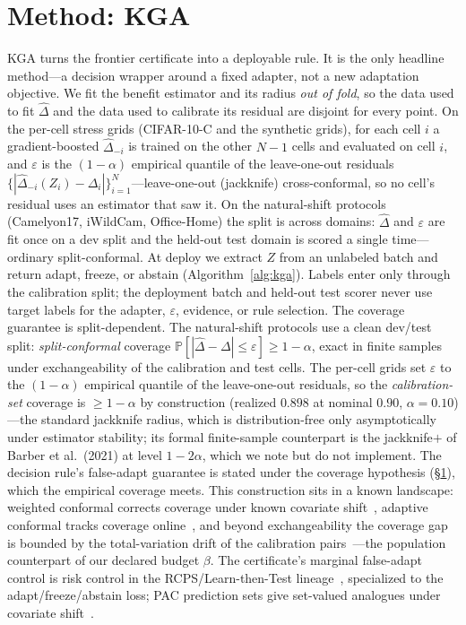 \documentclass[conference]{IEEEtran}
\theoremstyle{plain}
\theoremstyle{definition}
\theoremstyle{remark}
\renewcommand{\Pr}{\mathbb{P}}
\begin{document}
\section{Method: \textsc{KGA}}\label{sec:method}
\textsc{KGA} turns the frontier certificate into a deployable rule. It is the only headline
method---a decision wrapper around a fixed adapter, not a new adaptation objective. We fit the
benefit estimator and its radius \emph{out of fold}, so the data used to fit $\widehat\Delta$ and
the data used to calibrate its residual are disjoint for every point.
On the per-cell stress grids (CIFAR-10-C and the synthetic grids), for each cell $i$ a gradient-boosted
$\widehat\Delta_{-i}$ is trained on the other $N{-}1$ cells and evaluated on cell $i$, and
$\varepsilon$ is the $(1-\alpha)$ empirical quantile of the leave-one-out residuals
$\{|\widehat\Delta_{-i}(Z_i)-\Delta_i|\}_{i=1}^{N}$---leave-one-out (jackknife) cross-conformal, so no
cell's residual uses an estimator that saw it. On the natural-shift protocols (Camelyon17, iWildCam,
Office-Home) the split is across domains: $\widehat\Delta$ and $\varepsilon$ are fit once on a dev
split and the held-out test domain is scored a single time---ordinary split-conformal. At deploy we
extract $Z$ from an unlabeled batch and return adapt, freeze, or abstain (Algorithm~\ref{alg:kga}).
Labels enter only through the calibration split; the deployment batch and held-out test scorer never
use target labels for the adapter, $\varepsilon$, evidence, or rule selection. The coverage
guarantee is split-dependent. The natural-shift protocols use a clean dev/test split:
\emph{split-conformal} coverage $\Pr[|\widehat\Delta-\Delta|\le\varepsilon]\ge1-\alpha$, exact in
finite samples under exchangeability of the calibration and test cells. The per-cell grids set
$\varepsilon$ to the $(1-\alpha)$ empirical quantile of the leave-one-out residuals, so the
\emph{calibration-set} coverage is $\ge1-\alpha$ by construction (realized $0.898$ at nominal
$0.90$, $\alpha{=}0.10$)---the standard jackknife radius, which is distribution-free only
asymptotically under estimator stability; its formal finite-sample counterpart is the jackknife$+$
of Barber et al.\ (2021) at level $1-2\alpha$, which we note but do not implement. The decision
rule's false-adapt guarantee is stated under the coverage hypothesis (\S\ref{sec:method}), which the
empirical coverage meets. This construction sits in a known landscape: weighted conformal corrects
coverage under known covariate shift~\cite{tibshirani2019conformal}, adaptive conformal tracks
coverage online~\cite{gibbs2021adaptive}, and beyond exchangeability the coverage gap is bounded by
the total-variation drift of the calibration pairs~\cite{barber2023beyond}---the population
counterpart of our declared budget $\beta$. The certificate's marginal false-adapt control is risk
control in the RCPS/Learn-then-Test lineage~\cite{bates2021rcps,angelopoulos2025ltt}, specialized
to the adapt/freeze/abstain loss; PAC prediction sets give set-valued analogues under covariate
shift~\cite{park2022pac}.
\end{document}
